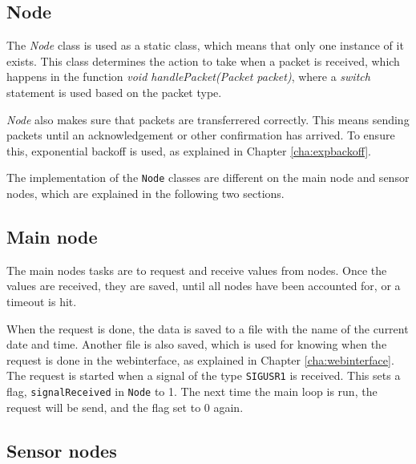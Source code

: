 \subsection{Node}
The \textit{Node} class is used as a static class, which means that only one instance of it exists. This class determines the action to take when a packet is received, which happens in the function \textit{void handlePacket(Packet packet)}, where a \textit{switch} statement is used based on the packet type.

\textit{Node} also makes sure that packets are transferrered correctly. This means sending packets until an acknowledgement or other confirmation has arrived. To ensure this, exponential backoff is used, as explained in Chapter \ref{cha:expbackoff}.

The implementation of the \texttt{Node} classes are different on the main node and sensor nodes, which are explained in the following two sections.

\subsection{Main node} \label{cha:signalhandling}
The main nodes tasks are to request and receive values from nodes. Once the values are received, they are saved, until all nodes have been accounted for, or a timeout is hit.

When the request is done, the data is saved to a file with the name of the current date and time. Another file is also saved, which is used for knowing when the request is done in the webinterface, as explained in Chapter \ref{cha:webinterface}. The request is started when a signal of the type \texttt{SIGUSR1} is received. This sets a flag, \texttt{signalReceived} in \texttt{Node} to 1. The next time the main loop is run, the request will be send, and the flag set to 0 again.

\subsection{Sensor nodes} 
